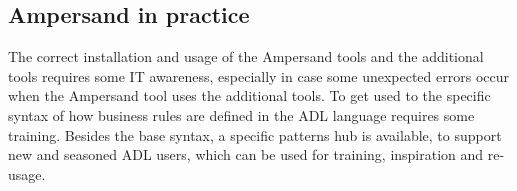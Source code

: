 \documentclass[journal,12pt,onecolumn,draftclsnofoot]{article}
\let\Oldsubsection\subsection
\renewcommand{\subsection}{\FloatBarrier\Oldsubsection}
\begin{document}
\subsection*{Ampersand in practice}
\indent The correct installation and usage of the Ampersand tools and the 
additional tools requires
some IT awareness, especially in case some unexpected errors occur when the Ampersand tool
uses the additional tools.
To get used to the specific syntax of how business rules are defined in the ADL language
requires some training. Besides the base syntax, a specific patterns hub is available, to support
new and seasoned ADL users, which can be used for training, inspiration and re-usage.





\newpage



\end{document}
